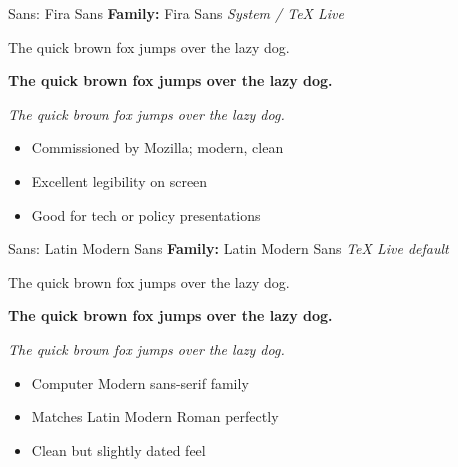 \documentclass[10pt]{beamer}
\begin{document}
\setmainfont{Fira Sans}

\begin{frame}{Sans: Fira Sans}
  \textbf{Family:} Fira Sans \hfill \textit{System / TeX Live}

  \vspace{0.3cm}
  {\Large The quick brown fox jumps over the lazy dog.}

  \vspace{0.2cm}
  \textbf{The quick brown fox jumps over the lazy dog.}

  \vspace{0.2cm}
  \textit{The quick brown fox jumps over the lazy dog.}

  \vspace{0.3cm}
  \begin{itemize}
    \item Commissioned by Mozilla; modern, clean
    \item Excellent legibility on screen
    \item Good for tech or policy presentations
  \end{itemize}
\end{frame}

\setmainfont{Latin Modern Sans}

\begin{frame}{Sans: Latin Modern Sans}
  \textbf{Family:} Latin Modern Sans \hfill \textit{TeX Live default}

  \vspace{0.3cm}
  {\Large The quick brown fox jumps over the lazy dog.}

  \vspace{0.2cm}
  \textbf{The quick brown fox jumps over the lazy dog.}

  \vspace{0.2cm}
  \textit{The quick brown fox jumps over the lazy dog.}

  \vspace{0.3cm}
  \begin{itemize}
    \item Computer Modern sans-serif family
    \item Matches Latin Modern Roman perfectly
    \item Clean but slightly dated feel
  \end{itemize}
\end{frame}

\setmainfont{Roboto}
\end{document}
